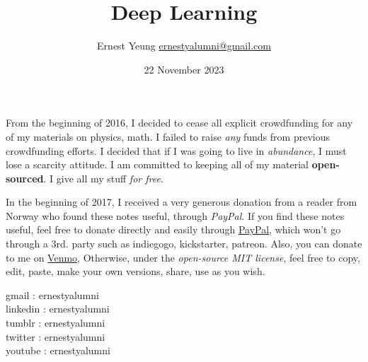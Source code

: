 \documentclass[10pt]{amsart}
\title{Deep Learning}
\author{Ernest Yeung \href{mailto:ernestyalumni@gmail.com}{ernestyalumni@gmail.com}}
\date{22 November 2023}
\begin{document}

\maketitle


From the beginning of 2016, I decided to cease all explicit crowdfunding for any of my materials on physics, math.  I failed to raise \emph{any} funds from previous crowdfunding efforts.  I decided that if I was going to live in \emph{abundance}, I must lose a scarcity attitude.  I am committed to keeping all of my material \textbf{open-sourced}.  I give all my stuff \emph{for free}.   

In the beginning of 2017, I received a very generous donation from a reader from Norway who found these notes useful, through \emph{PayPal}.  If you find these notes useful, feel free to donate directly and easily through \href{https://www.paypal.com/cgi-bin/webscr?cmd=_donations&business=ernestsaveschristmas%2bpaypal%40gmail%2ecom&lc=US&item_name=ernestyalumni&currency_code=USD&bn=PP%2dDonationsBF%3abtn_donateCC_LG%2egif%3aNonHosted}{PayPal}, which won't go through a 3rd. party such as indiegogo, kickstarter, patreon.  Also, you can donate to me on \href{https://venmo.com/ernestyalumni}{Venmo}, Otherwise, under the \emph{open-source MIT license}, feel free to copy, edit, paste, make your own versions, share, use as you wish.    

\noindent gmail        : ernestyalumni \\
linkedin     : ernestyalumni \\
tumblr       : ernestyalumni \\
twitter      : ernestyalumni \\
youtube      : ernestyalumni \\

\tableofcontents
\end{document}

